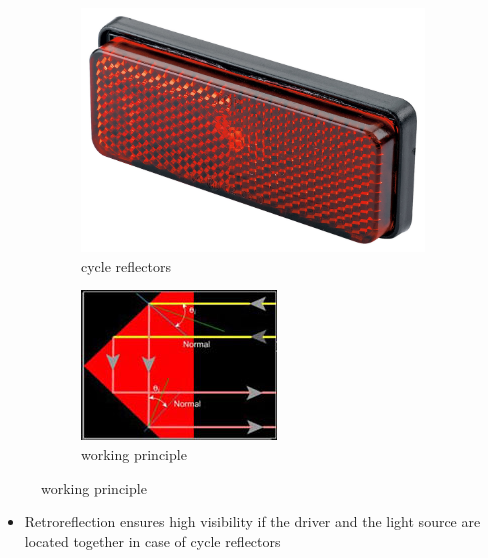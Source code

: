 \documentclass{beamer}
\begin{document}
\begin{frame}
	\begin{figure}
		\centering
		\begin{subfigure}[b]{0.4\textwidth}
			\centering
			\includegraphics[width=\textwidth]{17.jpeg}
			\caption{cycle reflectors}
			\label{cycle reflectors}
		\end{subfigure}
		\hfill
		\begin{subfigure}[b]{0.4\textwidth}
			\centering
			\includegraphics[width=\textwidth]{19.jpg}
			\caption{working principle}
			\label{fig:y equals x}
		\end{subfigure}
	\end{figure}
	\begin{itemize}
		\item Retroreflection ensures high visibility if the driver and the light source are located together in case of cycle reflectors
	\end{itemize}
\end{frame}
\end{document}
